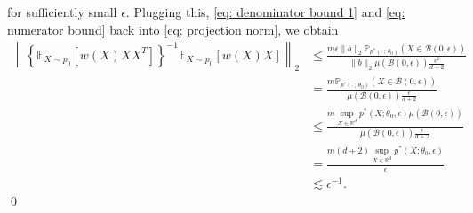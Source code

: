 \documentclass[11pt]{article}
\begin{document}
for sufficiently small $\epsilon$. Plugging this, \cref{eq: denominator bound 1} and \cref{eq: numerator bound} back into \cref{eq: projection norm}, we obtain
\begin{align*}
    \left\|\left\{\mathbb{E}_{X\sim p_0}[w(X)XX^{T}]\right\}^{-1}\mathbb{E}_{X \sim p_0}[w(X)X]\right\|_2 &\leq \frac{m\epsilon\|b\|_2\mathbb{P}_{p^*(\cdot\,;\,\theta_0)}(X \in \mathcal{B}(0, \epsilon))}{\|b\|_2\mu\left(\mathcal{B}(0, \epsilon)\right) \frac{\epsilon^2}{d+2}} \\
    &= \frac{m\mathbb{P}_{p^*(\cdot\,;\,\theta_0)}(X \in \mathcal{B}(0, \epsilon))}{\mu\left(\mathcal{B}(0, \epsilon)\right) \frac{\epsilon}{d+2}} \\
    &\leq \frac{m\sup_{X\in \mathbb{R}^d}p^*(X;\theta_0, \epsilon) \mu\left(\mathcal{B}(0, \epsilon)\right)}{\mu\left(\mathcal{B}(0, \epsilon)\right) \frac{\epsilon }{d+2}} \\
    &= \frac{m(d+2)\sup_{X\in \mathbb{R}^d}p^*(X;\theta_0, \epsilon)}{ \epsilon } \\
    &\lesssim \epsilon^{-1}.
\end{align*}
\qed{}
\end{document}
